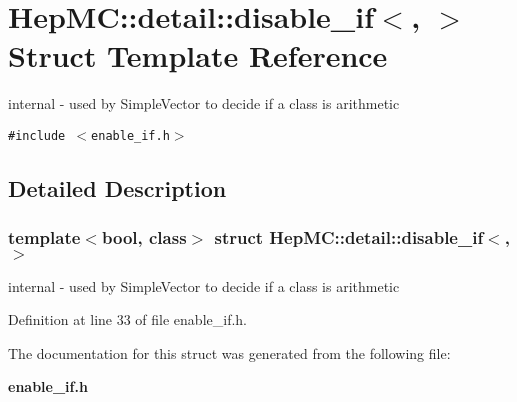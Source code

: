 \section{Hep\-MC::detail::disable\_\-if$<$, $>$ Struct Template Reference}
\label{structHepMC_1_1detail_1_1disable__if}
internal - used by Simple\-Vector to decide if a class is arithmetic  


{\tt \#include $<$enable\_\-if.h$>$}



\subsection{Detailed Description}
\subsubsection*{template$<$bool, class$>$ struct Hep\-MC::detail::disable\_\-if$<$, $>$}

internal - used by Simple\-Vector to decide if a class is arithmetic 



Definition at line 33 of file enable\_\-if.h.

The documentation for this struct was generated from the following file:\begin{CompactItemize}
\item 
{\bf enable\_\-if.h}\end{CompactItemize}
